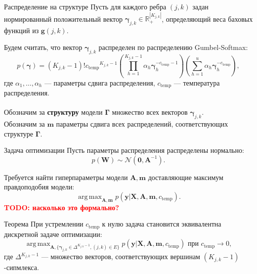 \documentclass[usenames,dvipsnames,11pt,pdf,utf8,russian,aspectratio=169]{beamer}
\DeclareMathOperator*{\argmax}{arg\,max}
\begin{document}
\begin{frame}{ Распределение на структуре}
Пусть для каждого ребра $(j,k)$ задан нормированный положительный вектор $\boldsymbol{\gamma}_{j,k} \in \mathbb{R}_{+}^{|K_{j,k}|}$, определяющий веса баховых функций из  $\mathbf{g}(j,k)$.

Будем считать, что вектор $\boldsymbol{\gamma}_{j,k}$ распределен по распределению Gumbel-Softmax:
\[
    p(\boldsymbol{\gamma}) = (K_{j,k}-1)!{c_{\text{temp}}}^{K_{j,k}-1}\left(\prod_{h=1}^{K_{j,k}-1} \alpha_h \boldsymbol{\gamma}_h^{-c_{\text{temp}}-1}\right)\left(\sum_{h=1}^u\alpha_h\boldsymbol{\gamma}_h^{-c_{\text{temp}}}\right),
\] 
где $\alpha_1,\dots,\alpha_h$ --- параметры сдвига распределения, $c_{\text{temp}}$ --- температура распределения. 
\\~\\
Обозначим за \textbf{структуру} модели $\boldsymbol{\Gamma}$ множество всех векторов $\boldsymbol{\gamma}_{j,k}$.\\
Обозначим за $\mathbf{m}$ параметры сдвига всех распределений, соответствующих структуре $\boldsymbol{\Gamma}$.

\end{frame}


\begin{frame}{Задача оптимизации}
Пусть параметры распределения распределены нормально:
\[
    p(\mathbf{W}) \sim \mathcal{N}(\mathbf{0}, \mathbf{A}^{-1}).
\]

Требуется найти гиперпараметры модели $\mathbf{A}, \mathbf{m}$ доставляющие максимум правдоподобия модели:
\[
    \argmax_{\mathbf{A}, \mathbf{m}}  p(\mathbf{y}|\mathbf{X},\mathbf{A},\mathbf{m}, c_{\text{temp}}).
\]                                                                                                                            
\textcolor{red}{\textbf{TODO: насколько это формально?\\}}
\begin{block}{Теорема}
При устремлении $c_{\text{temp}}$ к нулю задача становится эквивалентна дискретной задаче оптимизации:
\[
    \argmax_{\mathbf{A}, \{\boldsymbol{\gamma}_{j,k} \in \Delta^{K_{j,k} -1}, (j,k) \in E\}} p(\mathbf{y}|\mathbf{X},\mathbf{A},\mathbf{m}, c_{\text{temp}}) \text{ при }c_{\text{temp}} \to 0,
\]    
где $\Delta^{K_{j,k} -1}$ --- множество векторов, соответствующих вершинам $(K_{j,k}-1)$-сипмлекса.
\end{block}           
\end{frame}  
\end{document}
